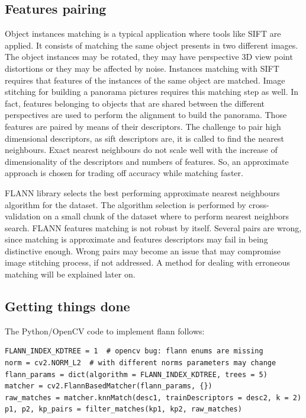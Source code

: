 \documentclass[aps,letterpaper,10pt]{revtex4}
\begin{document}
\subsection{Features pairing}
Object instances matching is a typical application where tools like SIFT are applied. It consists of matching the same object presents in two different images. The object instances may be rotated, they may have perspective 3D view point distortions or they may be affected by noise. Instances matching with SIFT requires that features of the instances of the same object are matched. Image stitching for building a panorama pictures requires this matching step as well. In fact, features belonging to objects that are shared between the different perspectives are used to perform the alignment to build the panorama. Those features are paired by means of their descriptors. The challenge to pair high dimensional descriptors, as sift descriptors are, it is called to find the nearest neighbours. Exact nearest neighbours do not scale well with the increase of dimensionality of the descriptors and numbers of features. So, an approximate approach is chosen for trading off accuracy while matching faster. 

FLANN library selects the best performing approximate nearest neighbours algorithm for the dataset. The algorithm selection is performed by cross-validation on a small chunk of the dataset where to perform nearest neighbors search. FLANN features matching is not robust by itself. Several pairs are wrong, since matching is approximate and features descriptors may fail in being distinctive enough. Wrong pairs may become an issue that may compromise image stitching process, if not addressed. A method for dealing with erroneous matching will be explained later on.
\subsection{Getting things done}
The Python/OpenCV code to implement flann follows: 
\begin{lstlisting}
FLANN_INDEX_KDTREE = 1  # opencv bug: flann enums are missing
norm = cv2.NORM_L2  # with different norms parameters may change 
flann_params = dict(algorithm = FLANN_INDEX_KDTREE, trees = 5)
matcher = cv2.FlannBasedMatcher(flann_params, {})
raw_matches = matcher.knnMatch(desc1, trainDescriptors = desc2, k = 2)
p1, p2, kp_pairs = filter_matches(kp1, kp2, raw_matches)
\end{lstlisting}
\end{document}
